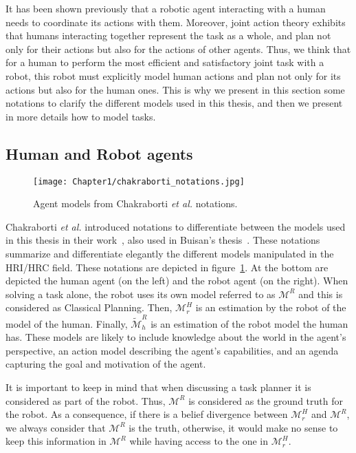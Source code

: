 It has been shown previously that a robotic agent interacting with a human needs to coordinate its actions with them. Moreover, joint action theory exhibits that humans interacting together represent the task as a whole, and plan not only for their actions but also for the actions of other agents. Thus, we think that for a human to perform the most efficient and satisfactory joint task with a robot, this robot must explicitly model human actions and plan not only for its actions but also for the human ones. This is why we present in this section some notations to clarify the different models used in this thesis, and then we present in more details how to model tasks.

\subsection{Human and Robot agents}

\begin{figure}
    \centering
    \texttt{[image: Chapter1/chakraborti\_notations.jpg]}
    \caption{Agent models from Chakraborti \textit{et al.} notations.}
    \label{fig:chakraborti_notations}
\end{figure}

Chakraborti \textit{et al.} introduced notations to differentiate between the models used in this thesis in their work~\cite{ChakrabortiBTZS15}, also used in Buisan's thesis~\cite{thesisBuisan21}. These notations summarize and differentiate elegantly the different models manipulated in the HRI/HRC field. These notations are depicted in figure~\ref{fig:chakraborti_notations}. At the bottom are depicted the human agent (on the left) and the robot agent (on the right). When solving a task alone, the robot uses its own model referred to as $\mathcal{M}^R$ and this is considered as Classical Planning. 
Then, $\mathcal{M}^H_r$ is an estimation by the robot of the model of the human. Finally, $\tilde{\mathcal{M}}^R_h$ is an estimation of the robot model the human has. These models are likely to include knowledge about the world in the agent's perspective, an action model describing the agent's capabilities, and an agenda capturing the goal and motivation of the agent.

It is important to keep in mind that when discussing a task planner it is considered as part of the robot. Thus, $\mathcal{M}^R$ is considered as the ground truth for the robot. As a consequence, if there is a belief divergence between $\mathcal{M}^H_r$ and $\mathcal{M}^R$, we always consider that $\mathcal{M}^R$ is the truth, otherwise, it would make no sense to keep this information in $\mathcal{M}^R$ while having access to the one in $\mathcal{M}^H_r$.

